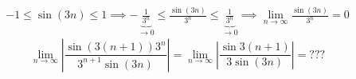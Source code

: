 \documentclass[../rgr_2.tex]{subfiles}
\begin{document}
\Solution

\begin{equation}
	\begin{aligned}
	-1\leq \sin(3n) \leq 1 \implies
	-\underbrace{\frac{1}{3^n}}_{\to0}\leq \frac{\sin(3n)}{3^n} \leq \underbrace{\frac{1}{3^n}}_{\to0} \implies
	\lim_{n\to\infty}\frac{\sin(3n)}{3^n} = 0
	\end{aligned}
\end{equation}
\begin{equation}
	\lim_{n\to\infty}\left|\frac{\sin(3(n+1))3^n}{3^{n+1}\sin(3n)}\right|
	= \lim_{n\to\infty}\left|\frac{\sin3(n+1)}{3\sin(3n)}\right|
	= ???
\end{equation}

\end{document}
